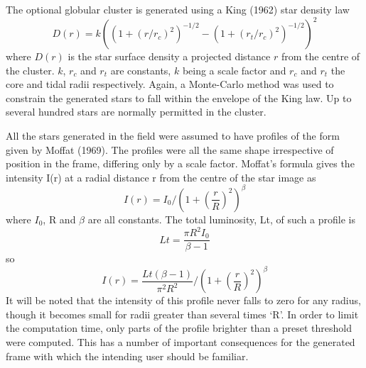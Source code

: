 The optional globular cluster is generated using a King (1962)
star density law
\begin{equation}
D(r)=k((1+(r/r_{c})^{2})^{-1/2}-(1+(r_{t}/r_{c})^{2})^{-1/2})^{2}
\end{equation}
where $D(r)$ is the star surface density a projected distance $r$ from the
centre of the cluster.
$k$, $r_{c}$ and $r_{t}$ are constants, $k$ being a scale factor and $r_{c}$
and $r_{t}$ the core and tidal radii respectively.
Again, a Monte-Carlo method was used to constrain the generated stars to fall
within the envelope of the King law.
Up to several hundred stars are normally permitted in the cluster.

All the stars generated in the field were assumed to have profiles of the form
given by Moffat (1969).
The profiles were all the same shape irrespective of position in the frame,
differing only by a scale factor.
Moffat's formula gives the intensity I(r) at a radial distance r from the centre
of the star image as
\begin{equation}
I(r)=I_{0}/(1+(\frac{r}{R})^{2})^{\beta}
\end{equation}
where $I_{0}$, R and $\beta$ are all constants.
The total luminosity, Lt, of such a profile is
\begin{equation}
Lt=\frac{\pi R^{2}I_{0}}{\beta -1}
\end{equation}
so
\begin{equation}
I(r)=\frac{Lt(\beta -1)}{\pi^{2}R^{2}}/(1+(\frac{r}{R})^{2})^{\beta}
\end{equation}
It will be noted that the intensity of this profile never falls to zero for any
radius, though it becomes small for radii greater than several times `R'.
In order to limit the computation time, only parts of the profile brighter than
a preset threshold were computed.
This has a number of important consequences for the generated frame with which
the intending user should be familiar.

